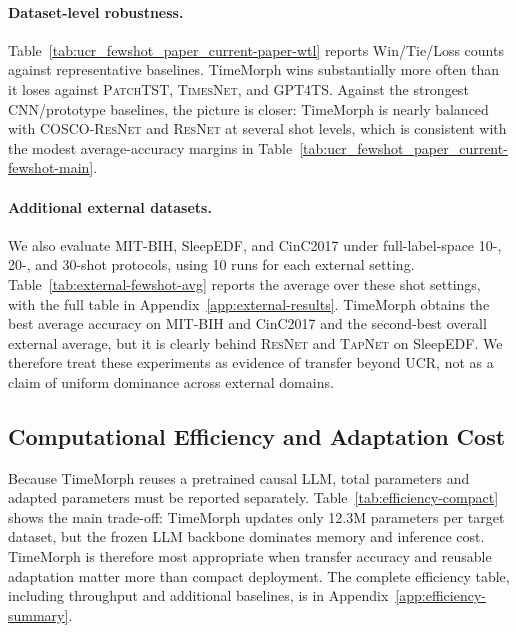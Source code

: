 \documentclass{article}
\begin{document}


\paragraph{Dataset-level robustness.}
Table~\ref{tab:ucr_fewshot_paper_current-paper-wtl} reports Win/Tie/Loss counts against representative baselines. TimeMorph wins substantially more often than it loses against \textsc{PatchTST}, \textsc{TimesNet}, and \textsc{GPT4TS}. Against the strongest CNN/prototype baselines, the picture is closer: TimeMorph is nearly balanced with \textsc{COSCO-ResNet} and \textsc{ResNet} at several shot levels, which is consistent with the modest average-accuracy margins in Table~\ref{tab:ucr_fewshot_paper_current-fewshot-main}.



\paragraph{Additional external datasets.}
We also evaluate MIT-BIH, SleepEDF, and CinC2017 under full-label-space 10-, 20-, and 30-shot protocols, using 10 runs for each external setting. Table~\ref{tab:external-fewshot-avg} reports the average over these shot settings, with the full table in Appendix~\ref{app:external-results}. TimeMorph obtains the best average accuracy on MIT-BIH and CinC2017 and the second-best overall external average, but it is clearly behind \textsc{ResNet} and \textsc{TapNet} on SleepEDF. We therefore treat these experiments as evidence of transfer beyond UCR, not as a claim of uniform dominance across external domains.



\subsection{Computational Efficiency and Adaptation Cost}
\label{sec:efficiency}

Because TimeMorph reuses a pretrained causal LLM, total parameters and adapted parameters must be reported separately. Table~\ref{tab:efficiency-compact} shows the main trade-off: TimeMorph updates only 12.3M parameters per target dataset, but the frozen LLM backbone dominates memory and inference cost. TimeMorph is therefore most appropriate when transfer accuracy and reusable adaptation matter more than compact deployment. The complete efficiency table, including throughput and additional baselines, is in Appendix~\ref{app:efficiency-summary}.
\end{document}
